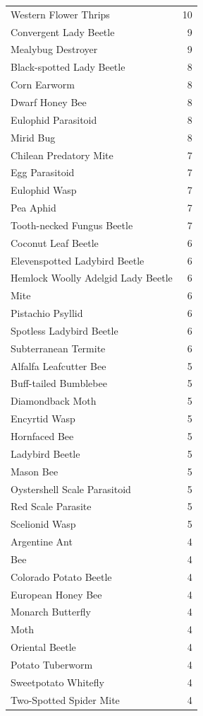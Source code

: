 \documentclass[
  12pt,
]{article}
\begin{document}
\begin{longtable}[]{@{}lr@{}}
Western Flower Thrips & 10 \\
Convergent Lady Beetle & 9 \\
Mealybug Destroyer & 9 \\
Black-spotted Lady Beetle & 8 \\
Corn Earworm & 8 \\
Dwarf Honey Bee & 8 \\
Eulophid Parasitoid & 8 \\
Mirid Bug & 8 \\
Chilean Predatory Mite & 7 \\
Egg Parasitoid & 7 \\
Eulophid Wasp & 7 \\
Pea Aphid & 7 \\
Tooth-necked Fungus Beetle & 7 \\
Coconut Leaf Beetle & 6 \\
Elevenspotted Ladybird Beetle & 6 \\
Hemlock Woolly Adelgid Lady Beetle & 6 \\
Mite & 6 \\
Pistachio Psyllid & 6 \\
Spotless Ladybird Beetle & 6 \\
Subterranean Termite & 6 \\
Alfalfa Leafcutter Bee & 5 \\
Buff-tailed Bumblebee & 5 \\
Diamondback Moth & 5 \\
Encyrtid Wasp & 5 \\
Hornfaced Bee & 5 \\
Ladybird Beetle & 5 \\
Mason Bee & 5 \\
Oystershell Scale Parasitoid & 5 \\
Red Scale Parasite & 5 \\
Scelionid Wasp & 5 \\
Argentine Ant & 4 \\
Bee & 4 \\
Colorado Potato Beetle & 4 \\
European Honey Bee & 4 \\
Monarch Butterfly & 4 \\
Moth & 4 \\
Oriental Beetle & 4 \\
Potato Tuberworm & 4 \\
Sweetpotato Whitefly & 4 \\
Two-Spotted Spider Mite & 4 \\

\end{longtable}
\end{document}
